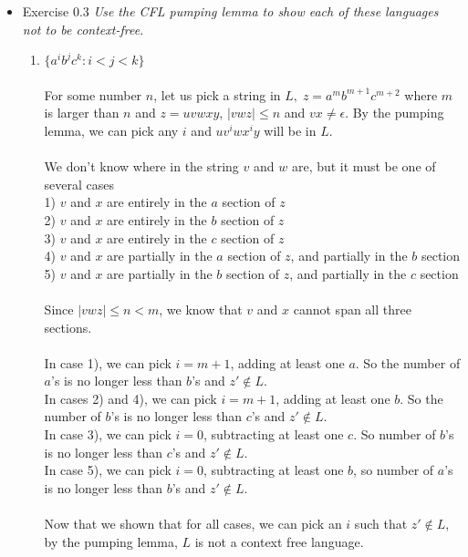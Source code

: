 \documentclass[a4paper]{article}
\begin{document}
\begin{itemize}
\item{Exercise 0.3} \emph{Use the CFL pumping lemma to show each of these languages not to be context-free.}
\begin{enumerate}
\item $\{a^ib^jc^k : i < j < k\}$ \\
\\
For some number $n$, let us pick a string in $L,\;z = a^mb^{m+1}c^{m+2}$ where $m$ is larger than $n$ and $z = uvwxy$, $|vwz| \leq n$ and $vx \neq \epsilon$. By the pumping lemma, we can pick any $i$ and $uv^iwx^iy$ will be in $L$. \\
\\
We don't know where in the string $v$ and $w$ are, but it must be one of several cases \\
1) $v$ and $x$ are entirely in the $a$ section of $z$ \\
2) $v$ and $x$ are entirely in the $b$ section of $z$ \\
3) $v$ and $x$ are entirely in the $c$ section of $z$ \\
4) $v$ and $x$ are partially in the $a$ section of $z$, and partially in the $b$ section \\
5) $v$ and $x$ are partially in the $b$ section of $z$, and partially in the $c$ section \\
\\
Since $|vwz| \leq n < m$, we know that $v$ and $x$ cannot span all three sections. \\
\\
In case 1), we can pick $i = m+1$, adding at least one $a$. So the number of $a$'s is no longer less than $b$'s and $z' \notin L$. \\
In cases 2) and 4), we can pick $i = m+1$, adding at least one $b$. So the number of $b$'s is no longer less than $c$'s and $z' \notin L$. \\
In case 3), we can pick $i = 0$, subtracting at least one $c$. So number of $b$'s is no longer less than $c$'s and $z' \notin L$. \\
In case 5), we can pick $i = 0$, subtracting at least one $b$, so number of $a$'s is no longer less than $b$'s and $z' \notin L$. \\
\\
Now that we shown that for all cases, we can pick an $i$ such that  $z' \notin L$, by the pumping lemma, $L$ is not a context free language. \\


\end{enumerate}
\end{itemize}
\end{document}
